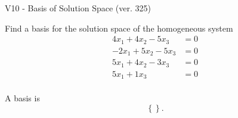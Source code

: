 \begin{exercise}
  \begin{exerciseTitle}V10 - Basis of Solution Space (ver. 325)\end{exerciseTitle}
  \begin{exerciseStatement}
    Find a basis for the solution space of the homogeneous system 
\begin{align*}
 4 x_ 1 + 4 x_ 2 -5 x_ 3 &= 0  \\ 
  -2 x_ 1 + 5 x_ 2 -5 x_ 3 &= 0  \\ 
  5 x_ 1 + 4 x_ 2 -3 x_ 3 &= 0  \\ 
  5 x_ 1 + 1 x_ 3 &= 0  \\ 
 \end{align*}


 
  \end{exerciseStatement}

  \begin{exerciseAnswer}
   A basis is   
\[\left\{\right\}.\]

  


  \end{exerciseAnswer}
\end{exercise}